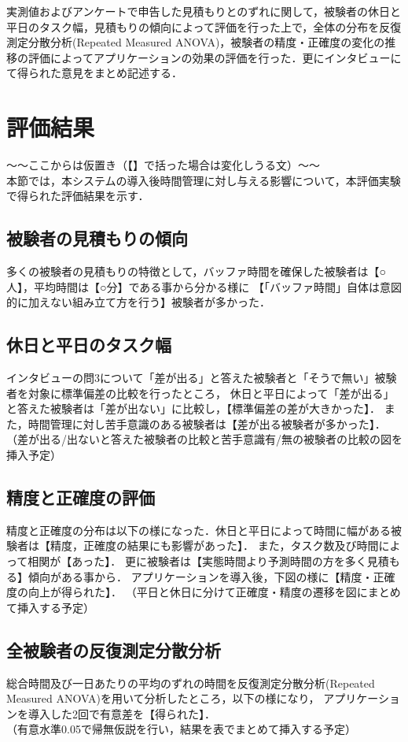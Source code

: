 実測値およびアンケートで申告した見積もりとのずれに関して，被験者の休日と平日のタスク幅，見積もりの傾向によって評価を行った上で，全体の分布を反復測定分散分析(Repeated Measured ANOVA)，被験者の精度・正確度の変化の推移の評価によってアプリケーションの効果の評価を行った．更にインタビューにて得られた意見をまとめ記述する．

\section{評価結果}
〜〜ここからは仮置き（【】で括った場合は変化しうる文）〜〜\\
本節では，本システムの導入後時間管理に対し与える影響について，本評価実験で得られた評価結果を示す．
\subsection{被験者の見積もりの傾向}
多くの被験者の見積もりの特徴として，バッファ時間を確保した被験者は【○人】，平均時間は【○分】である事から分かる様に
【「バッファ時間」自体は意図的に加えない組み立て方を行う】被験者が多かった．

\subsection{休日と平日のタスク幅}
インタビューの問3について「差が出る」と答えた被験者と「そうで無い」被験者を対象に標準偏差の比較を行ったところ，
休日と平日によって「差が出る」と答えた被験者は「差が出ない」に比較し，【標準偏差の差が大きかった】．
また，時間管理に対し苦手意識のある被験者は【差が出る被験者が多かった】．
\\
（差が出る/出ないと答えた被験者の比較と苦手意識有/無の被験者の比較の図を挿入予定）
\subsection{精度と正確度の評価}
精度と正確度の分布は以下の様になった．休日と平日によって時間に幅がある被験者は【精度，正確度の結果にも影響があった】．
また，タスク数及び時間によって相関が【あった】．
更に被験者は【実態時間より予測時間の方を多く見積もる】傾向がある事から．
アプリケーションを導入後，下図の様に【精度・正確度の向上が得られた】．
（平日と休日に分けて正確度・精度の遷移を図にまとめて挿入する予定）\\
\subsection{全被験者の反復測定分散分析}
総合時間及び一日あたりの平均のずれの時間を反復測定分散分析(Repeated Measured ANOVA)を用いて分析したところ，以下の様になり，
アプリケーションを導入した2回で有意差を【得られた】．
\\
（有意水準0.05で帰無仮説を行い，結果を表でまとめて挿入する予定）

